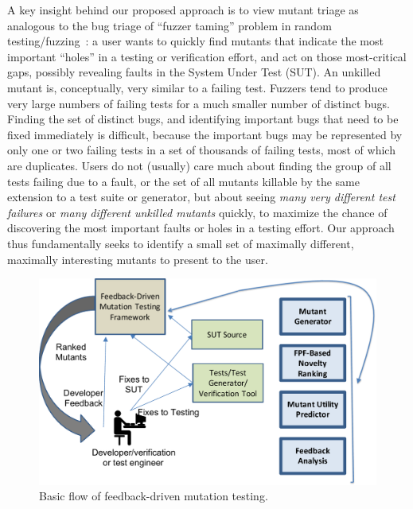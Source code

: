 A key insight behind our proposed approach is to view mutant triage as
analogous to the bug triage of  ``fuzzer
taming'' problem in random testing/fuzzing~\cite{PLDI13,SemCrash,vantonder-ase18}:  a user wants
to quickly find mutants that indicate the most important ``holes'' in a testing
or verification effort, and act on those most-critical gaps, possibly revealing
faults in the System Under Test (SUT).
An unkilled mutant is, conceptually, very similar to a failing test.
Fuzzers tend to produce very large numbers of failing tests for a much
smaller number of distinct bugs.  Finding the set of distinct bugs,
and identifying important bugs that need to be fixed immediately is
difficult, because the important bugs may be represented by only one
or two failing tests in a set of thousands of failing tests, most of
which are duplicates.
Users do not (usually) care much
about finding the group of all tests failing due to a fault, or the
set of all mutants killable by the same extension to a test suite or
generator, but about seeing \emph{many very different test failures}
or \emph{many
  different unkilled mutants} quickly, to maximize the chance of
discovering the most important faults or holes in a testing effort.
Our approach thus fundamentally seeks to identify a small set of maximally different, maximally interesting mutants to present
to the user.

\begin{figure}
\centering
\includegraphics[width=0.8\columnwidth]{TestFlow}

\caption{Basic flow of feedback-driven mutation testing. }
\label{fig:flow}
\end{figure}

